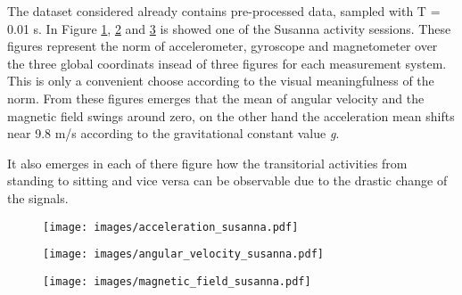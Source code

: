 \documentclass[10pt, conference, letterpaper]{IEEEtran}
\begin{document}
The dataset considered already contains pre-processed data, sampled with T = 0.01 s. In Figure \ref{fig:acc}, \ref{fig:gyr} and \ref{fig:mag} is showed one of the Susanna activity sessions. These figures represent the norm of accelerometer, gyroscope and magnetometer over the three global coordinats insead of three figures for each measurement system. This is only a convenient choose according to the visual meaningfulness of the norm.
From these figures emerges that the mean of angular velocity and the magnetic field swings around zero, on the other hand the acceleration mean shifts near 9.8 m/s according to the gravitational constant value \textit{g}.

It also emerges in each of there figure how the transitorial activities from standing to sitting and vice versa can be observable due to the drastic change of the signals.

\begin{figure}
\texttt{[image: images/acceleration\_susanna.pdf]}
\caption{}
\label{fig:acc}
\end{figure}

\begin{figure}
\texttt{[image: images/angular\_velocity\_susanna.pdf]}
\caption{}
\label{fig:gyr}
\end{figure}

\begin{figure}
\texttt{[image: images/magnetic\_field\_susanna.pdf]}
\caption{}
\label{fig:mag}
\end{figure}




















\end{document}
